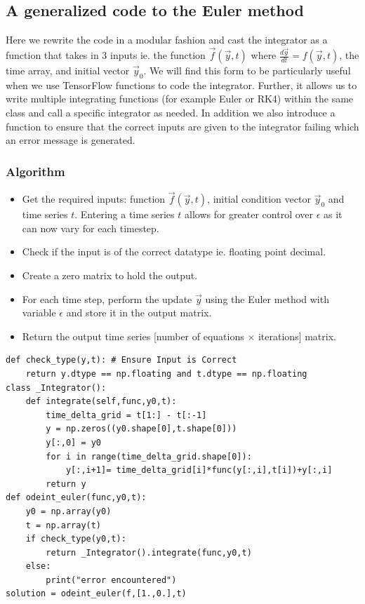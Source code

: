 \documentclass[10pt,letterpaper]{article}
\begin{document}
\begin{nolinenumbers}
\subsection*{A generalized code to the Euler method}
Here we rewrite the code in a modular fashion and cast the integrator as a function that takes in 3 inputs ie. the function $\vec{f}(\vec{y},t)$ where $\frac{d\vec{y}}{dt}=f(\vec{y},t)$, the time array, and initial vector $\vec{y}_{0}$. We will find this form to be particularly useful when we use TensorFlow functions to code the integrator. Further, it allows us to write multiple integrating functions (for example Euler or RK4) within the same class and call a specific integrator as needed. In addition we also introduce a function to ensure that the correct inputs are given to the integrator failing which an error message is generated. 

\subsubsection*{Algorithm}

\begin{itemize}
\item Get the required inputs: function $\vec{f}(\vec{y},t)$, initial condition vector $\vec{y}_0$ and time series $t$. Entering a time series $t$ allows for greater control over $\epsilon$ as it can now vary for each timestep. 
\item Check if the input is of the correct datatype ie. floating point decimal.
\item Create a zero matrix to hold the output.
\item For each time step, perform the update $\vec{y}$ using the Euler method with variable $\epsilon$ and store it in the output matrix.
\item Return the output time series [number of equations $\times$ iterations] matrix.
\end{itemize}

\begin{verbatim}
def check_type(y,t): # Ensure Input is Correct
    return y.dtype == np.floating and t.dtype == np.floating
class _Integrator():
    def integrate(self,func,y0,t):
        time_delta_grid = t[1:] - t[:-1]
        y = np.zeros((y0.shape[0],t.shape[0]))
        y[:,0] = y0
        for i in range(time_delta_grid.shape[0]):
            y[:,i+1]= time_delta_grid[i]*func(y[:,i],t[i])+y[:,i]
        return y
def odeint_euler(func,y0,t):
    y0 = np.array(y0)
    t = np.array(t)
    if check_type(y0,t):
        return _Integrator().integrate(func,y0,t)
    else:
        print("error encountered")
solution = odeint_euler(f,[1.,0.],t)
\end{verbatim}


\end{nolinenumbers}
\end{document}
